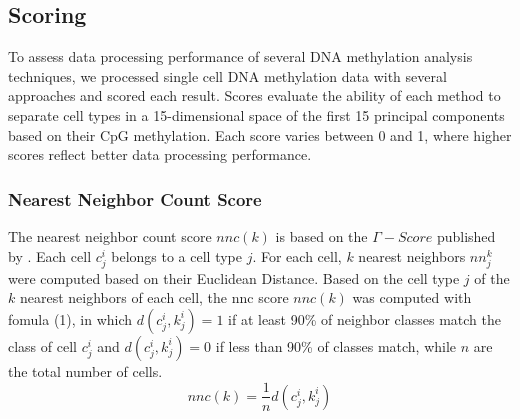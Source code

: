 \documentclass[twocolumn,10pt]{article}
\begin{document}
\subsection{Scoring}
To assess data processing performance of several DNA methylation analysis techniques, we processed single cell DNA methylation data with several approaches and scored each result. Scores evaluate the ability of each method to separate cell types in a 15-dimensional space of the first 15 principal components based on their CpG methylation. Each score varies between 0 and 1, where higher scores reflect better data processing performance.
\subsubsection{Nearest Neighbor Count Score}
The nearest neighbor count score $nnc(k)$ is based on the $\Gamma -Score$ published by \citealp{Kireeva_2014}. Each cell $c_j^i$ belongs to a cell type $j$. For each cell, $k$ nearest neighbors $nn_j^k$ were computed based on their Euclidean Distance. Based on the cell type $j$ of the $k$ nearest neighbors of each cell, the nnc score $nnc(k)$ was computed with fomula (1), in which $d(c_j^i, k_j^i)=1$ if at least 90\% of neighbor classes match the class of cell $c_j^i$ and $d(c_j^i, k_j^i)=0$ if less than 90\% of classes match, while $n$ are the total number of cells.
\begin{equation}
	nnc(k) = \frac{1}{n}d(c_j^i, k_j^i)
\end{equation}



{\small }
\end{document}
